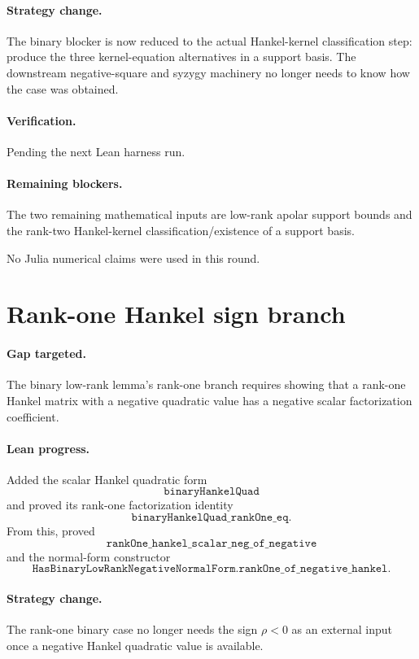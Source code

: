\documentclass[11pt]{article}
\begin{document}
\paragraph{Strategy change.}
The binary blocker is now reduced to the actual Hankel-kernel classification
step: produce the three kernel-equation alternatives in a support basis.  The
downstream negative-square and syzygy machinery no longer needs to know how the
case was obtained.

\paragraph{Verification.}
Pending the next Lean harness run.

\paragraph{Remaining blockers.}
The two remaining mathematical inputs are low-rank apolar support bounds and
the rank-two Hankel-kernel classification/existence of a support basis.

No Julia numerical claims were used in this round.

\section*{Rank-one Hankel sign branch}

\paragraph{Gap targeted.}
The binary low-rank lemma's rank-one branch requires showing that a rank-one
Hankel matrix with a negative quadratic value has a negative scalar
factorization coefficient.

\paragraph{Lean progress.}
Added the scalar Hankel quadratic form
\[
\texttt{binaryHankelQuad}
\]
and proved its rank-one factorization identity
\[
\texttt{binaryHankelQuad\_rankOne\_eq}.
\]
From this, proved
\[
\texttt{rankOne\_hankel\_scalar\_neg\_of\_negative}
\]
and the normal-form constructor
\[
\texttt{HasBinaryLowRankNegativeNormalForm.rankOne\_of\_negative\_hankel}.
\]

\paragraph{Strategy change.}
The rank-one binary case no longer needs the sign \(\rho<0\) as an external
input once a negative Hankel quadratic value is available.
\end{document}
